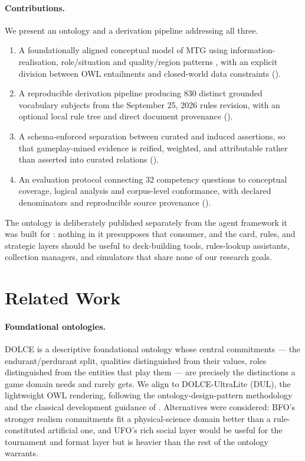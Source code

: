 \documentclass[11pt,a4paper]{article}
\begin{document}
\paragraph{Contributions.} We present an ontology and a derivation pipeline addressing all three.
\begin{enumerate}[leftmargin=1.2em, itemsep=2pt]
  \item A foundationally aligned conceptual model of MTG using information-realisation, role/situation and quality/region patterns \citep{gangemi2002dolce, borgo2022dolce, gangemi2009odp}, with an explicit division between OWL entailments and closed-world data constraints ().
  \item A reproducible derivation pipeline producing 830 distinct grounded vocabulary subjects from the September 25, 2026 rules revision, with an optional local rule tree and direct document provenance ().
  \item A schema-enforced separation between curated and induced assertions, so that gameplay-mined evidence is reified, weighted, and attributable rather than asserted into curated relations ().
  \item An evaluation protocol connecting 32 competency questions to conceptual coverage, logical analysis and corpus-level conformance, with declared denominators and reproducible source provenance ().
\end{enumerate}

The ontology is deliberately published separately from the agent framework it was built for \citep{neuburger2026agents}: nothing in it presupposes that consumer, and the card, rules, and strategic layers should be useful to deck-building tools, rules-lookup assistants, collection managers, and simulators that share none of our research goals.

\section{Related Work}
\label{sec:related}

\paragraph{Foundational ontologies.} DOLCE \citep{gangemi2002dolce, borgo2022dolce} is a descriptive foundational ontology whose central commitments --- the endurant/perdurant split, qualities distinguished from their values, roles distinguished from the entities that play them --- are precisely the distinctions a game domain needs and rarely gets. We align to DOLCE-UltraLite (DUL), the lightweight OWL rendering, following the ontology-design-pattern methodology \citep{gangemi2009odp} and the classical development guidance of \citet{noy2001ontology}. Alternatives were considered: BFO's stronger realism commitments fit a physical-science domain better than a rule-constituted artificial one, and UFO's rich social layer would be useful for the tournament and format layer but is heavier than the rest of the ontology warrants.
\end{document}
